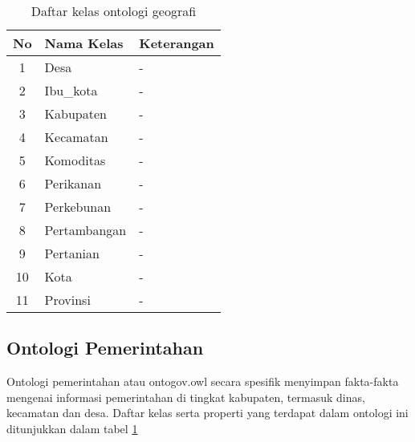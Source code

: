 \begin{table}[!]
	\caption{Daftar kelas ontologi geografi}
	\label{table:ontogeo_class}
	\begin{tabularx}{\textwidth}{|c|X|X|}
		\hline
		No & Nama Kelas & Keterangan \\
		\hline
		1 & Desa & - \\
		\hline
		2 & Ibu\_kota & - \\
		\hline
		3 & Kabupaten & - \\
		\hline
		4 & Kecamatan & - \\
		\hline
		5 & Komoditas & - \\
		\hline
		6 & Perikanan & - \\
		\hline
		7 & Perkebunan & - \\
		\hline
		8 & Pertambangan & - \\
		\hline
		9 & Pertanian & - \\
		\hline
		10 & Kota & - \\
		\hline
		11 & Provinsi & - \\
		\hline
	\end{tabularx}
\end{table}

\subsection{Ontologi Pemerintahan}
Ontologi pemerintahan atau ontogov.owl secara spesifik menyimpan fakta-fakta mengenai informasi pemerintahan di tingkat kabupaten, termasuk dinas, kecamatan dan desa. Daftar kelas serta properti yang terdapat dalam ontologi ini ditunjukkan dalam tabel \ref{table:ontogeo_class}

